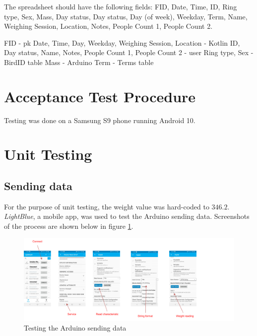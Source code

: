 \documentclass[class=report,11pt,crop=false]{standalone}
\begin{document}
		The spreadsheet should have the following fields: FID, Date, Time, ID, Ring type, Sex, Mass, Day status, Day status, Day (of week), Weekday, Term, Name, Weighing Session, Location, Notes, People Count 1, People Count 2.
		
		FID - pk
		Date, Time, Day, Weekday, Weighing Session, Location - Kotlin
		ID, Day status, Name, Notes, People Count 1, People Count 2 - user
		Ring type, Sex - BirdID table
		Mass - Arduino
		Term - Terms table
		
	
	
	\section{Acceptance Test Procedure}
	Testing was done on a Samsung S9 phone running Android 10.
	\section{Unit Testing}
		
		\subsection{Sending data}
		For the purpose of unit testing, the weight value was hard-coded to $346.2$.
		\textit{LightBlue}, a mobile app, was used to test the Arduino sending data. Screenshots of the process are shown below in figure \ref{fig:screenshots-of-testing-ble-posting}.
		
		\begin{figure}[h!]
			\centering
			\includegraphics[width=1.2\linewidth]{"Figures/Screenshots of testing BLE posting"}
			\caption{Testing the Arduino sending data}
			\label{fig:screenshots-of-testing-ble-posting}
		\end{figure}
	
\end{document}
